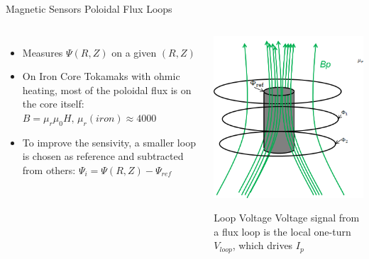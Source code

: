\documentclass{beamer}
\begin{document}
\begin{frame}{Magnetic Sensors } {Poloidal Flux  Loops}
\begin{columns}
  \begin{itemize}
  \item Measures $\Psi(R, Z)$ on a given $(R, Z)$
  \item On Iron Core Tokamaks with ohmic heating, most of the poloidal flux is on the core itself:
$B = \mu_r \mu_0 H, \, \mu_r(iron) \approx 4000$ 
 \item To improve the sensivity, a smaller loop is chosen as reference and subtracted from others:
$\Psi_{i} =\Psi(R, Z)  - \Psi_{ref} $ 
 \end{itemize}

	\begin{center}
	\includegraphics[width=.6\columnwidth]{fluxloops.png}
   	\begin{block}{Loop Voltage} 
		Voltage signal from a flux loop is the local one-turn
	$V_{loop}$, which drives $I_p$
  	\end{block} 
	\end{center}

\end{columns}	
\end{frame}
\end{document}
